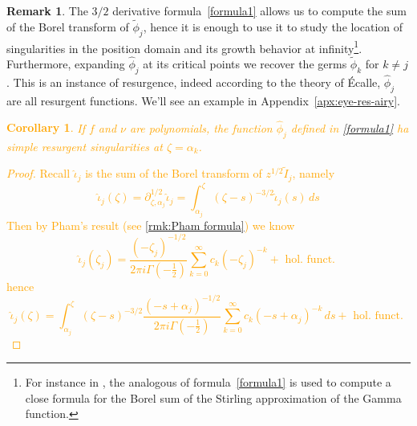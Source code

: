 \documentclass{article}
\theoremstyle{definition}
\newcommand{\series}[1]{\tilde{#1}}
\newcommand{\fracderiv}[3]{\partial^{#1}_{#2, #3}}
\newtheorem{remark}[definition]{Remark}
\theoremstyle{plain}
\newtheorem{corollary}[theorem]{Corollary}
\begin{document}
\begin{remark}
    The $3/2$ derivative formula~\eqref{formula1} allows us to compute the sum of the Borel transform of $\series{\phi}_j$, hence it is enough to use it to study the location of singularities in the position domain and its growth behavior at infinity\footnote{For instance in \cite{sauzin2021variations}, the analogous of formula~\eqref{formula1} is used to compute a close formula for the Borel sum of the Stirling approximation of the Gamma function.}. Furthermore, expanding $\hat{\phi}_j$ at its critical points we recover the germs $\series{\phi}_k$ for $k\neq j$. This is an instance of resurgence, indeed according to the theory of \'Ecalle, $\hat{\phi}_j$ are all resurgent functions. We'll see an example in Appendix~\ref{apx:eye-res-airy}. 
\end{remark}
\textcolor{orange}{
\begin{corollary}\label{simple-res-thimble}
    If $f$ and $\nu$ are polynomials, the function $\hat{\phi}_j$ defined in \eqref{formula1} ha simple resurgent singularities at $\zeta=\alpha_k$.  
\end{corollary}
\begin{proof}
    Recall $\hat{\iota}_j$ is the sum of the Borel transform of $z^{1/2}\tilde{I}_j$, namely 
    \[\hat{\iota}_j(\zeta)=\fracderiv{1/2}{\zeta}{\alpha_j}\hat{\iota}_j=\int_{\alpha_j}^\zeta(\zeta-s)^{-3/2}\hat{\iota}_j(s)\, ds\]
    Then by Pham's result (see \eqref{rmk:Pham formula}) we know 
    \[\hat{\iota}_j(\zeta_j)=\frac{(-\zeta_j)^{-1/2}}{2\pi i\Gamma(-\tfrac{1}{2})}\sum_{k=0}^\infty c_k (-\zeta_j)^{-k} + \text{ hol. funct. }\]
hence 
\[\hat{\iota}_j(\zeta)=\int_{\alpha_j}^\zeta(\zeta-s)^{-3/2}\frac{(-s+\alpha_j)^{-1/2}}{2\pi i\Gamma(-\tfrac{1}{2})}\sum_{k=0}^\infty c_k (-s+\alpha_j)^{-k} \, ds + \text{ hol. funct. }\]
\end{proof}
}
\end{document}
